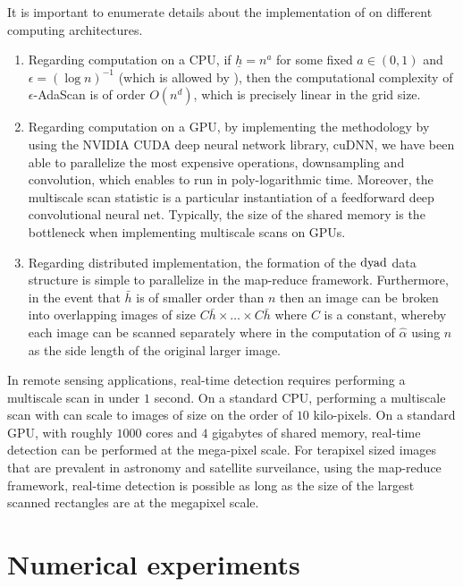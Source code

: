 \documentclass[twoside,11pt]{article}
\begin{document}
\begin{remark}
It is important to enumerate details about the implementation of  on different computing architectures.
\begin{enumerate}
\item Regarding computation on a CPU, if $\underline h = n^{a}$ for some fixed $a \in (0,1)$ and $\epsilon = (\log n)^{-1}$ (which is allowed by ), then the computational complexity of $\epsilon$-AdaScan is of order $O(n^d)$, which is precisely linear in the grid size.
\item Regarding computation on a GPU, by implementing the methodology by using the NVIDIA CUDA deep neural network library, cuDNN, we have been able to parallelize the most expensive operations, downsampling and convolution, which enables  to run in poly-logarithmic time.  Moreover, the multiscale scan statistic is a particular instantiation of a feedforward deep convolutional neural net.  Typically, the size of the shared memory is the bottleneck when implementing multiscale scans on GPUs.
\item Regarding distributed implementation, the formation of the ${\rm dyad}$ data structure is simple to parallelize in the map-reduce framework.  Furthermore, in the event that $\bar h$ is of smaller order than $n$ then an image can be broken into overlapping images of size $C\bar h \times \ldots \times C\bar h$ where $C$ is a constant, whereby each image can be scanned separately where in the computation of $\hat \alpha$ using $n$ as the side length of the original larger image.
\end{enumerate}
\end{remark}

In remote sensing applications, real-time detection requires performing a multiscale scan in under $1$ second.
On a standard CPU, performing a multiscale scan with  can scale to images of size on the order of $10$ kilo-pixels.
On a standard GPU, with roughly $1000$ cores and $4$ gigabytes of shared memory, real-time detection can be performed at the mega-pixel scale.
For terapixel sized images that are prevalent in astronomy and satellite surveilance, using the map-reduce framework, real-time detection is possible as long as the size of the largest scanned rectangles are at the megapixel scale.


\section{Numerical experiments}
\label{sec:experiments}
\end{document}
